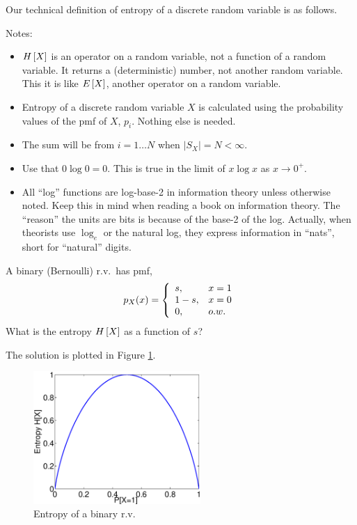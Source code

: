 Our technical definition of entropy of a discrete random variable is as
follows.


Notes:
\begin{itemize}
  \item $H\left[ {X} \right]$ is an operator on a random variable, not a function of a random variable.
    It returns a (deterministic) number, not another random variable.  This it is like
    $E_{}\left[ {X} \right]$, another operator on a random variable.
  \item Entropy of a discrete random variable $X$ is calculated using the
    probability values of the pmf of $X$, $p_i$.  Nothing else is needed.
  \item The sum will be from $i=1\ldots N$ when $|S_X| = N < \infty$.
  \item Use that $0 \log 0 = 0$.  This is true in the limit of $x \log x$
    as $x \rightarrow 0^+$.
  \item All ``log'' functions are log-base-2 in information theory
    unless otherwise noted. Keep this in mind when reading a book on information theory.
  The ``reason'' the units are bits is because of the base-2 of the log.
   Actually, when theorists use $\log_e$ or the natural log, they express information in ``nats'', short for ``natural'' digits.
\end{itemize}

 A binary (Bernoulli) r.v.\ has pmf,
\[
  p_X(x) = { \left\{\begin{array}{ll} {s}, & {x=1} \\ {1-s}, & {x=0} \\ 0, & o.w. \end{array}\right. }
\]
What is the entropy $H\left[ {X} \right]$ as a function of $s$?

The solution is plotted in Figure \ref{F:EntropyBinaryRV}.

\begin{figure}[htbp]
  \centerline{  \includegraphics[width=2.5in]{../images/plotEntropyBinaryRV.eps}  }
  \caption{Entropy of a binary r.v.}
  \label{F:EntropyBinaryRV}
\end{figure}

